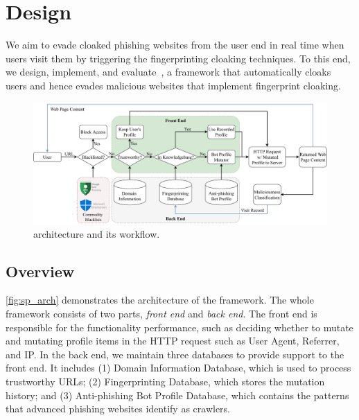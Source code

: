 \section{Design}


We aim to evade cloaked phishing websites from the user end in real time when users visit them by triggering the fingerprinting cloaking techniques.
To this end, we design, implement, and evaluate~\spartacus, a framework that automatically cloaks users and hence evades malicious websites that implement fingerprint cloaking.

\begin{figure}
\centering
\includegraphics[width=\linewidth]{figs/arch.pdf}
\caption{\spartacus architecture and its workflow.}
\label{fig:sp_arch}
\end{figure}

\subsection{Overview}
\autoref{fig:sp_arch} demonstrates the architecture of the \spartacus framework.
The whole framework consists of two parts, \emph{front end} and \emph{back end}. 
The front end is responsible for the functionality performance, such as deciding whether to mutate and mutating profile items in the HTTP request such as User Agent, Referrer, and IP.
In the back end, we maintain three databases to provide support to the front end.
It includes (1) Domain Information Database, which is used to process trustworthy URLs;
(2) Fingerprinting Database, which stores the mutation history;
and (3) Anti-phishing Bot Profile Database, which contains the patterns that advanced phishing websites identify as crawlers.

